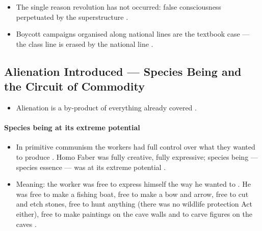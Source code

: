 \begin{QuickRevision}
\begin{itemize}
    \item The single reason revolution has not occurred: false consciousness perpetuated by the superstructure .
    \item Boycott campaigns organised along national lines are the textbook case --- the class line is erased by the national line .
\end{itemize}
\end{QuickRevision}

\subsection{Alienation Introduced --- Species Being and the Circuit of Commodity}
\begin{itemize}
    \item Alienation is a by-product of everything already covered .
\end{itemize}

\paragraph{Species being at its extreme potential}
\begin{itemize}
    \item In primitive communism the workers had full control over what they wanted to produce . Homo Faber was fully creative, fully expressive; species being --- species essence --- was at its extreme potential .
    \item Meaning: the worker was free to express himself the way he wanted to . He was free to make a fishing boat, free to make a bow and arrow, free to cut and etch stones, free to hunt anything (there was no wildlife protection Act either), free to make paintings on the cave walls and to carve figures on the caves .
\end{itemize}

